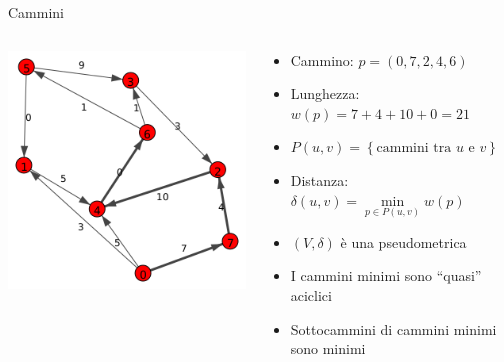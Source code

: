 \documentclass{beamer}
\theoremstyle{plain}
\theoremstyle{definition}
\theoremstyle{remark}
\newcommand{\set}[1]{\left\{#1\right\}}
\newcommand{\pa}[1]{\left(#1\right)}
\begin{document}
\begin{frame}{Cammini}
  \begin{columns}
    \begin{column}{0.40\textwidth}
      \includegraphics[width=\textwidth]{directpath}
    \end{column}
    \begin{column}{0.58\textwidth}
      \begin{itemize}
      \item<1-> Cammino: $p = \pa{ 0,7,2, 4,6}$
      \item<1-> Lunghezza: $w(p) = 7+4+10+0 = 21$
      \item<2-> $P(u,v) = \set{\text{cammini tra }u\text{ e }v}$
      \item<2-> Distanza: $\delta (u,v) = \min \limits _{p\in P(u,v)}
        w(p)$
      \item<3-> $\pa{V,\delta}$ \`e una pseudometrica
      \item<3-> I cammini minimi sono ``quasi'' aciclici
      \item<3-> Sottocammini di cammini minimi sono minimi
      \end{itemize}
    \end{column}
  \end{columns}
\end{frame}
\end{document}

